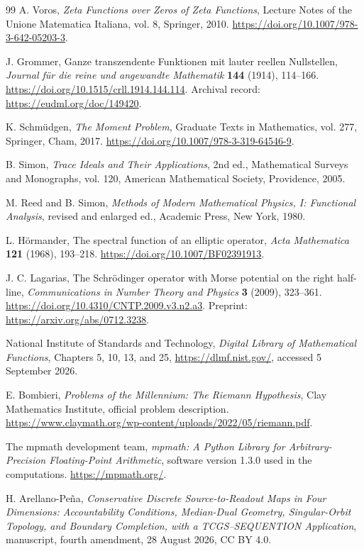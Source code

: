 \documentclass[11pt,letterpaper]{article}
\numberwithin{equation}{section}
\theoremstyle{definition}
\theoremstyle{remark}
\begin{document}
\begin{thebibliography}{99}
A. Voros,
\emph{Zeta Functions over Zeros of Zeta Functions},
Lecture Notes of the Unione Matematica Italiana, vol. 8,
Springer, 2010.
\url{https://doi.org/10.1007/978-3-642-05203-3}.

J. Grommer,
Ganze transzendente Funktionen mit lauter reellen Nullstellen,
\emph{Journal f\"ur die reine und angewandte Mathematik} \textbf{144} (1914), 114--166.
\url{https://doi.org/10.1515/crll.1914.144.114}.
Archival record: \url{https://eudml.org/doc/149420}.

K. Schm\"udgen,
\emph{The Moment Problem},
Graduate Texts in Mathematics, vol. 277,
Springer, Cham, 2017.
\url{https://doi.org/10.1007/978-3-319-64546-9}.

B. Simon,
\emph{Trace Ideals and Their Applications},
2nd ed., Mathematical Surveys and Monographs, vol. 120,
American Mathematical Society, Providence, 2005.

M. Reed and B. Simon,
\emph{Methods of Modern Mathematical Physics, I: Functional Analysis},
revised and enlarged ed., Academic Press, New York, 1980.

L. H\"ormander,
The spectral function of an elliptic operator,
\emph{Acta Mathematica} \textbf{121} (1968), 193--218.
\url{https://doi.org/10.1007/BF02391913}.

J. C. Lagarias,
The Schr\"odinger operator with Morse potential on the right half-line,
\emph{Communications in Number Theory and Physics} \textbf{3} (2009), 323--361.
\url{https://doi.org/10.4310/CNTP.2009.v3.n2.a3}.
Preprint: \url{https://arxiv.org/abs/0712.3238}.

National Institute of Standards and Technology,
\emph{Digital Library of Mathematical Functions},
Chapters 5, 10, 13, and 25,
\url{https://dlmf.nist.gov/}, accessed 5 September 2026.

E. Bombieri,
\emph{Problems of the Millennium: The Riemann Hypothesis},
Clay Mathematics Institute, official problem description.
\url{https://www.claymath.org/wp-content/uploads/2022/05/riemann.pdf}.

The mpmath development team,
\emph{mpmath: A Python Library for Arbitrary-Precision Floating-Point Arithmetic},
software version 1.3.0 used in the computations.
\url{https://mpmath.org/}.


H. Arellano-Pe\~na,
\emph{Conservative Discrete Source-to-Readout Maps in Four Dimensions:
Accountability Conditions, Median-Dual Geometry, Singular-Orbit Topology,
and Boundary Completion, with a TCGS--SEQUENTION Application},
manuscript, fourth amendment, 28 August 2026, CC BY 4.0.


\end{thebibliography}
\end{document}
